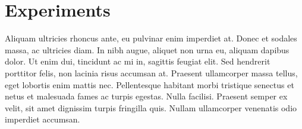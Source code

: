 
\chapter{Experiments}
Aliquam ultricies rhoncus ante, eu pulvinar enim imperdiet at. Donec et sodales massa, ac ultricies diam. In nibh augue, aliquet non urna eu, aliquam dapibus dolor. Ut enim dui, tincidunt ac mi in, sagittis feugiat elit. Sed hendrerit porttitor felis, non lacinia risus accumsan at. Praesent ullamcorper massa tellus, eget lobortis enim mattis nec. Pellentesque habitant morbi tristique senectus et netus et malesuada fames ac turpis egestas. Nulla facilisi. Praesent semper ex velit, sit amet dignissim turpis fringilla quis. Nullam ullamcorper venenatis odio imperdiet accumsan.
